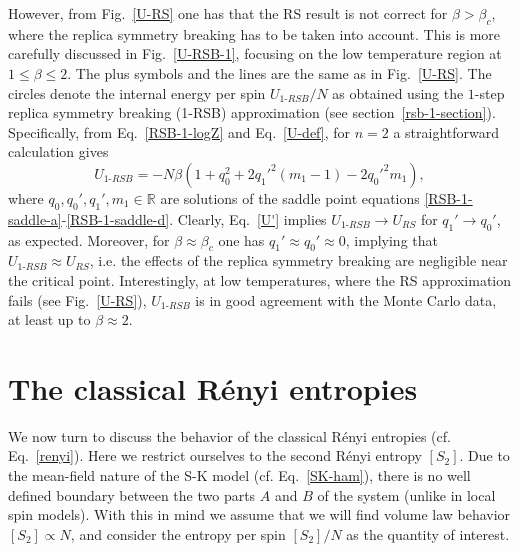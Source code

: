 \documentclass[twocolumn,superscriptaddress,prb,10pt]{revtex4-1}
\begin{document}
However, from Fig.~\ref{U-RS} one has that the RS result is not correct for $\beta>\beta_c$, 
where the replica symmetry breaking has to be taken into account. This is  more carefully 
discussed in Fig.~\ref{U-RSB-1}, focusing on the low temperature region at $1\le\beta\le 2$. 
The plus symbols and the lines are the same as in Fig.~\ref{U-RS}. The circles denote the 
internal energy per spin $U_{1\textrm{-}RSB}/N$ as obtained using the $1$-step replica 
symmetry breaking (1-RSB) approximation (see section~\ref{rsb-1-section}). Specifically, 
from Eq.~\eqref{RSB-1-logZ} and Eq.~\eqref{U-def}, for $n=2$ a straightforward calculation 
gives 
%
\begin{equation}
U_{1\textrm{-}RSB}=-N\beta(1+q_0^2+2q_1'^2(m_1-1)-2q_0'^2m_1), 
\label{U'}
\end{equation}
%
where $q_0,q_0',q_1',m_1\in\mathbb{R}$ are solutions of the saddle point 
equations \eqref{RSB-1-saddle-a}-\eqref{RSB-1-saddle-d}. Clearly, Eq.~\eqref{U'} 
implies $U_{1\textrm{-}RSB}\to U_{RS}$ for $q_1'\to q_0'$, as expected. 
Moreover, for $\beta\approx\beta_c$ one has $q_1'\approx q_0'\approx0$, implying   
that $U_{1\textrm{-}RSB}\approx U_{RS}$, i.e. the effects of the replica symmetry 
breaking are negligible near the critical point. Interestingly, at low temperatures, where the 
RS approximation fails (see Fig.~\ref{U-RS}), $U_{1\textrm{-}RSB}$ 
is in good agreement with the Monte Carlo data, at least up to $\beta\approx 2$.  



\section{The classical R\'enyi entropies}
\label{Renyi-section}

We now turn to discuss the behavior of the classical R\'enyi entropies 
(cf. Eq.~\eqref{renyi}). Here we restrict ourselves to the second R\'enyi 
entropy $[S_2]$. Due to the mean-field nature of the S-K model (cf. Eq.~\eqref{SK-ham}), 
there is no well defined boundary between the two parts $A$ and $B$ of the system 
(unlike in local spin models). With this in mind we assume that we will find volume law 
behavior $[S_2]\propto N$, and consider the entropy per spin 
$[S_2]/N$ as the quantity of interest. 
\end{document}
